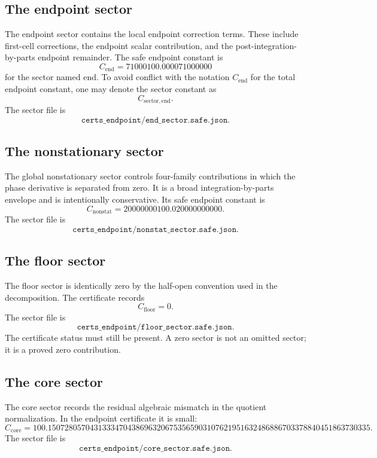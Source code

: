 \documentclass[11pt]{article}
\newcommand{\Cend}{C_{\mathrm{end}}}
\begin{document}
\subsection{The endpoint sector}

The endpoint sector contains the local endpoint correction terms.  These include first-cell corrections, the endpoint scalar contribution, and the post-integration-by-parts endpoint remainder.  The safe endpoint constant is
\[
C_{\mathrm{end}}
=
71000100.000071000000
\]
for the sector named \(\mathrm{end}\).  To avoid conflict with the notation \(\Cend\) for the total endpoint constant, one may denote the sector constant as
\[
C_{\mathrm{sector,end}}.
\]
The sector file is
\[
\texttt{certs\_endpoint/end\_sector.safe.json}.
\]

\subsection{The nonstationary sector}

The global nonstationary sector controls four-family contributions in which the phase derivative is separated from zero.  It is a broad integration-by-parts envelope and is intentionally conservative.  Its safe endpoint constant is
\[
C_{\mathrm{nonstat}}
=
20000000100.020000000000.
\]
The sector file is
\[
\texttt{certs\_endpoint/nonstat\_sector.safe.json}.
\]

\subsection{The floor sector}

The floor sector is identically zero by the half-open convention used in the decomposition.  The certificate records
\[
C_{\mathrm{floor}}=0.
\]
The sector file is
\[
\texttt{certs\_endpoint/floor\_sector.safe.json}.
\]
The certificate status must still be present.  A zero sector is not an omitted sector; it is a proved zero contribution.

\subsection{The core sector}

The core sector records the residual algebraic mismatch in the quotient normalization.  In the endpoint certificate it is small:
\[
C_{\mathrm{core}}
=
100.15072805704313334704386963206753565903107621951632486886703378840451863730335.
\]
The sector file is
\[
\texttt{certs\_endpoint/core\_sector.safe.json}.
\]
\end{document}

